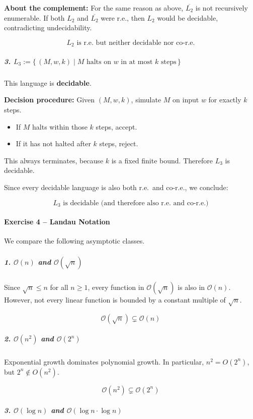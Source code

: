 \documentclass[11pt, a4paper]{article}
\theoremstyle{definition}
\theoremstyle{remark}
\begin{document}
\textbf{About the complement:}
For the same reason as above, $\overline{L_2}$ is not recursively enumerable.
If both $L_2$ and $\overline{L_2}$ were r.e., then $L_2$ would be decidable, contradicting undecidability.

\[
\boxed{L_2 \text{ is r.e.\ but neither decidable nor co-r.e.}}
\]

\subparagraph{3. $L_3 := \{\, (M,w,k) \mid M \text{ halts on } w \text{ in at most } k \text{ steps} \,\}$}

This language is \textbf{decidable}.

\textbf{Decision procedure:}
Given $(M,w,k)$, simulate $M$ on input $w$ for exactly $k$ steps.
\begin{itemize}
    \item If $M$ halts within those $k$ steps, accept.
    \item If it has not halted after $k$ steps, reject.
\end{itemize}

This always terminates, because $k$ is a fixed finite bound.
Therefore $L_3$ is decidable.

Since every decidable language is also both r.e.\ and co-r.e., we conclude:

\[
\boxed{L_3 \text{ is decidable (and therefore also r.e.\ and co-r.e.)}}
\]

\paragraph{Exercise 4 -- Landau Notation}

We compare the following asymptotic classes.

\subparagraph{1. $\mathcal{O}(n)$ and $\mathcal{O}(\sqrt{n})$}

Since $\sqrt{n} \le n$ for all $n \ge 1$, every function in $\mathcal{O}(\sqrt{n})$ is also in $\mathcal{O}(n)$.
However, not every linear function is bounded by a constant multiple of $\sqrt{n}$.

\[
\boxed{\mathcal{O}(\sqrt{n}) \subsetneq \mathcal{O}(n)}
\]

\subparagraph{2. $\mathcal{O}(n^2)$ and $\mathcal{O}(2^n)$}

Exponential growth dominates polynomial growth.
In particular, $n^2 = O(2^n)$, but $2^n \notin O(n^2)$.

\[
\boxed{\mathcal{O}(n^2) \subsetneq \mathcal{O}(2^n)}
\]

\subparagraph{3. $\mathcal{O}(\log n)$ and $\mathcal{O}(\log n \cdot \log n)$}
\end{document}
